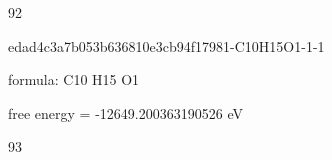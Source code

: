 \documentclass{article}
\begin{document}
92

\vspace{1cm}


edad4c3a7b053b636810e3cb94f17981-C10H15O1-1-1



formula: C10 H15 O1



free energy = -12649.200363190526 eV

93
\end{document}
